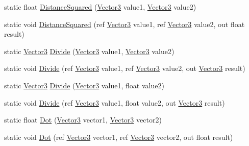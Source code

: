 \begin{DoxyCompactItemize}
\item 
static float \hyperlink{structMicrosoft_1_1Xna_1_1Framework_1_1Vector3_aa0632281edb554fb9aa7eb6be16fe160}{Distance\+Squared} (\hyperlink{structMicrosoft_1_1Xna_1_1Framework_1_1Vector3}{Vector3} value1, \hyperlink{structMicrosoft_1_1Xna_1_1Framework_1_1Vector3}{Vector3} value2)
\item 
static void \hyperlink{structMicrosoft_1_1Xna_1_1Framework_1_1Vector3_ae4c2f1f1f0ec18b788b56c6346703e44}{Distance\+Squared} (ref \hyperlink{structMicrosoft_1_1Xna_1_1Framework_1_1Vector3}{Vector3} value1, ref \hyperlink{structMicrosoft_1_1Xna_1_1Framework_1_1Vector3}{Vector3} value2, out float result)
\item 
static \hyperlink{structMicrosoft_1_1Xna_1_1Framework_1_1Vector3}{Vector3} \hyperlink{structMicrosoft_1_1Xna_1_1Framework_1_1Vector3_ab259d86ab652d7cebb77dbc2dbe917df}{Divide} (\hyperlink{structMicrosoft_1_1Xna_1_1Framework_1_1Vector3}{Vector3} value1, \hyperlink{structMicrosoft_1_1Xna_1_1Framework_1_1Vector3}{Vector3} value2)
\item 
static void \hyperlink{structMicrosoft_1_1Xna_1_1Framework_1_1Vector3_a7c2d382f7b9093de97f4d024ae250cc9}{Divide} (ref \hyperlink{structMicrosoft_1_1Xna_1_1Framework_1_1Vector3}{Vector3} value1, ref \hyperlink{structMicrosoft_1_1Xna_1_1Framework_1_1Vector3}{Vector3} value2, out \hyperlink{structMicrosoft_1_1Xna_1_1Framework_1_1Vector3}{Vector3} result)
\item 
static \hyperlink{structMicrosoft_1_1Xna_1_1Framework_1_1Vector3}{Vector3} \hyperlink{structMicrosoft_1_1Xna_1_1Framework_1_1Vector3_aec26a96fe449d308af2a6a07775c9a41}{Divide} (\hyperlink{structMicrosoft_1_1Xna_1_1Framework_1_1Vector3}{Vector3} value1, float value2)
\item 
static void \hyperlink{structMicrosoft_1_1Xna_1_1Framework_1_1Vector3_af0c6da8c95b384f5d38c32c38f21ef5c}{Divide} (ref \hyperlink{structMicrosoft_1_1Xna_1_1Framework_1_1Vector3}{Vector3} value1, float value2, out \hyperlink{structMicrosoft_1_1Xna_1_1Framework_1_1Vector3}{Vector3} result)
\item 
static float \hyperlink{structMicrosoft_1_1Xna_1_1Framework_1_1Vector3_a27b63d6a546f1fe372f7e2052437923f}{Dot} (\hyperlink{structMicrosoft_1_1Xna_1_1Framework_1_1Vector3}{Vector3} vector1, \hyperlink{structMicrosoft_1_1Xna_1_1Framework_1_1Vector3}{Vector3} vector2)
\item 
static void \hyperlink{structMicrosoft_1_1Xna_1_1Framework_1_1Vector3_ac9c37aec96cc21968fa536497ce059c3}{Dot} (ref \hyperlink{structMicrosoft_1_1Xna_1_1Framework_1_1Vector3}{Vector3} vector1, ref \hyperlink{structMicrosoft_1_1Xna_1_1Framework_1_1Vector3}{Vector3} vector2, out float result)

\end{DoxyCompactItemize}
